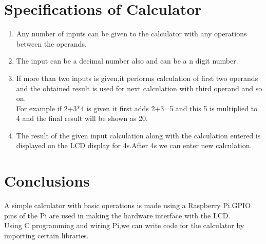 \documentclass[11pt]{article}
\begin{document}
\section{Specifications of Calculator}
\begin{enumerate}

	\item Any number of inputs can be given to the calculator with any operations between the operands.
	\item The input can be a decimal number also and  can be a n digit number.
	\item If more than two inputs is given,it performs calculation of first two operands and the obtained result is used for next calculation with third operand and so on.\\
	For example if 2+3*4 is given it first adds 2+3=5 and this 5 is multiplied to 4 and the final result will be shown as 20.
	\item The result of the given input calculation along with the calculation entered is displayed on the LCD display for 4s.After 4s we can enter new calculation.
			
\end{enumerate}

\section{Conclusions}
A simple calculator with basic operations is made using a Raspberry Pi.GPIO pins of the Pi are used in making the hardware interface with the LCD.\\
Using C programming and wiring Pi,we can write code for the calculator by importing certain libraries.
		
\renewcommand\thesection{\Alph{section}}
\end{document}

